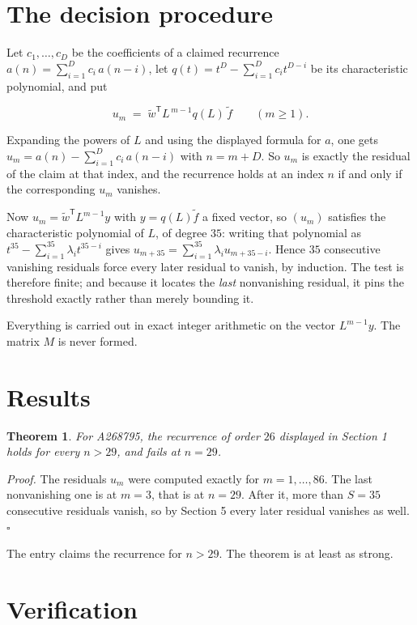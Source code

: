 \documentclass[11pt]{article}
\newtheorem{theorem}{Theorem}
\theoremstyle{definition}
\begin{document}
\section{The decision procedure}

Let $c_1,\dots,c_D$ be the coefficients of a claimed recurrence $a(n) = \sum_{i=1}^{D} c_i\,a(n-i)$, let $q(t) = t^{D} - \sum_{i=1}^{D} c_i t^{D-i}$ be its characteristic polynomial, and put

\[u_m \;=\; \tilde w^{\mathsf T} L^{\,m-1} q(L)\,\tilde f \qquad (m \ge 1).\]

Expanding the powers of $L$ and using the displayed formula for $a$, one gets $u_m = a(n) - \sum_{i=1}^{D} c_i\,a(n-i)$ with $n = m + D$. So $u_m$ is exactly the residual of the claim at that index, and the recurrence holds at an index $n$ if and only if the corresponding $u_m$ vanishes.

Now $u_m = \tilde w^{\mathsf T} L^{m-1} y$ with $y = q(L)\tilde f$ a fixed vector, so $(u_m)$ satisfies the characteristic polynomial of $L$, of degree $35$: writing that polynomial as $t^{35} - \sum_{i=1}^{35} \lambda_i t^{35-i}$ gives $u_{m+35} = \sum_{i=1}^{35} \lambda_i u_{m+35-i}$. Hence $35$ consecutive vanishing residuals force every later residual to vanish, by induction. The test is therefore finite; and because it locates the {\itshape last} nonvanishing residual, it pins the threshold exactly rather than merely bounding it.

Everything is carried out in exact integer arithmetic on the vector $L^{m-1}y$. The matrix $M$ is never formed.

\section{Results}

\begin{theorem} For A268795, the recurrence of order $26$ displayed in Section 1 holds for every $n > 29$, and fails at $n = 29$.\end{theorem}

{\itshape Proof.} The residuals $u_m$ were computed exactly for $m = 1,\dots,86$. The last nonvanishing one is at $m = 3$, that is at $n = 29$. After it, more than $S = 35$ consecutive residuals vanish, so by Section 5 every later residual vanishes as well. $\square$

The entry claims the recurrence for $n > 29$. The theorem is at least as strong.

\section{Verification}
\end{document}
